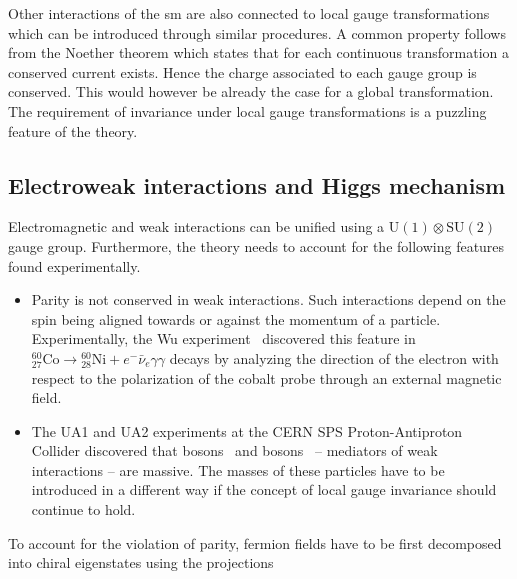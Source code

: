 Other interactions of the \gls{sm} are also connected to local gauge transformations which can be introduced through similar procedures. A common property follows from the Noether theorem which states that for each continuous transformation a conserved current exists. Hence the charge associated to each gauge group is conserved. This would however be already the case for a global transformation. The requirement of invariance under local gauge transformations is a puzzling feature of the theory. 

\subsection{Electroweak interactions and Higgs mechanism}
\label{sec:theory-ewk}

Electromagnetic and weak interactions can be unified using a $\mathrm{U(1)}\otimes \mathrm{SU(2)}$ gauge group. Furthermore, the theory needs to account for the following features found experimentally.

\begin{itemize}

\item Parity is not conserved in weak interactions. Such interactions depend on the spin being aligned towards or against the momentum of a particle. Experimentally, the Wu experiment~\cite{PhysRev.105.1413} discovered this feature in ${}_{27}^{60}\mathrm{Co}\to{}_{28}^{60}\mathrm{Ni}+e^{-}\bar{\nu}_{e}\gamma\gamma$ decays by analyzing the direction of the electron with respect to the polarization of the cobalt probe through an external magnetic field. 

\item The UA1 and UA2 experiments at the CERN SPS Proton-Antiproton Collider discovered that \wboson bosons~\cite{Arnison:1983rp,Banner:1983jy} and \zboson bosons~\cite{Arnison:1983mk,Bagnaia:1983zx} -- mediators of weak interactions -- are massive. The masses of these particles have to be introduced in a different way if the concept of local gauge invariance should continue to hold.

\end{itemize}

To account for the violation of parity, fermion fields have to be first decomposed into chiral eigenstates using the projections

